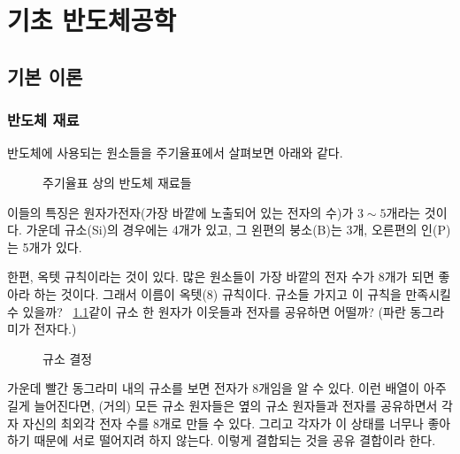\chapter{기초 반도체공학}
\section{기본 이론}
\subsection{반도체 재료}
반도체에 사용되는 원소들을 주기율표에서 살펴보면 아래와 같다.
\begin{figure}[!hbp]
    \centering
    \caption{주기율표 상의 반도체 재료들}
\end{figure}
이들의 특징은 원자가전자(가장 바깥에 노출되어 있는 전자의 수)가 $3\sim 5$개라는 것이다. 가운데 규소(Si)의 경우에는 4개가 있고, 그 왼편의 붕소(B)는 3개, 오른편의 인(P)는 5개가 있다.

한편, 옥텟 규칙이라는 것이 있다. 많은 원소들이 가장 바깥의 전자 수가 8개가 되면 좋아라 하는 것이다. 그래서 이름이 옥텟(8) 규칙이다.
규소들 가지고 이 규칙을 만족시킬 수 있을까? \figurename~\ref{fig:si crystal}\과 같이 규소 한 원자가 이웃들과 전자를 공유하면 어떨까? (파란 동그라미가 전자다.)
\begin{figure}[!tbp]
    \centering
    \caption{규소 결정}\label{fig:si crystal}
\end{figure}
가운데 빨간 동그라미 내의 규소를 보면 전자가 8개임을 알 수 있다. 이런 배열이 아주 길게 늘어진다면, (거의) 모든 규소 원자들은 옆의 규소 원자들과 전자를 공유하면서 각자 자신의 최외각 전자 수를 8개로 만들 수 있다.
그리고 각자가 이 상태를 너무나 좋아하기 때문에 서로 떨어지려 하지 않는다. 이렇게 결합되는 것을 공유 결합이라 한다.

